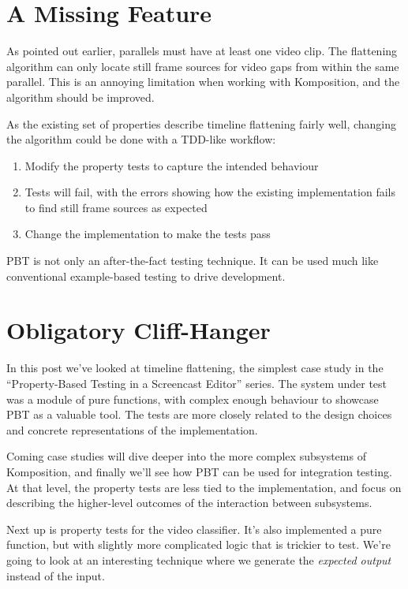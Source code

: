 \section{A Missing Feature}

As pointed out earlier, parallels must have at least one video clip. The flattening algorithm can only locate still frame sources for video gaps from within the same parallel. This is an annoying limitation when working with Komposition, and the algorithm should be improved.

As the existing set of properties describe timeline flattening fairly well, changing the algorithm could be done with a TDD-like workflow:

\begin{enumerate}
\item Modify the property tests to capture the intended behaviour
\item Tests will fail, with the errors showing how the existing implementation fails to find still frame sources as expected
\item Change the implementation to make the tests pass                                                
\end{enumerate}
PBT is not only an after-the-fact testing technique. It can be used much like conventional example-based testing to drive development.

\section{Obligatory Cliff-Hanger}

In this post we've looked at timeline flattening, the simplest case study in the ``Property-Based Testing in a Screencast Editor'' series. The system under test was a module of pure functions, with complex enough behaviour to showcase PBT as a valuable tool. The tests are more closely related to the design choices and concrete representations of the implementation.

Coming case studies will dive deeper into the more complex subsystems of Komposition, and finally we'll see how PBT can be used for integration testing. At that level, the property tests are less tied to the implementation, and focus on describing the higher-level outcomes of the interaction between subsystems.

Next up is property tests for the video classifier. It's also implemented a pure function, but with slightly more complicated logic that is trickier to test. We're going to look at an interesting technique where we generate the \textit{expected output} instead of the input.



